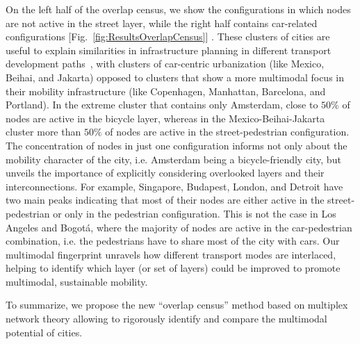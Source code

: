 On the left half of the overlap census, we show the configurations in which nodes are not active in the street layer, while the right half contains car-related configurations [Fig.~\ref{fig:ResultsOverlapCensus}] . These clusters of cities are useful to explain similarities in infrastructure planning in different transport development paths~\cite{Rodrigue2013Geography,louf2014typology}, with clusters of car-centric urbanization (like Mexico, Beihai, and Jakarta) opposed to clusters that show a more multimodal focus in their mobility infrastructure (like Copenhagen, Manhattan, Barcelona, and Portland). In the extreme cluster that contains only Amsterdam, close to $50\%$ of nodes are active in the bicycle layer, whereas in the Mexico-Beihai-Jakarta cluster more than $50\%$ of nodes are active in the street-pedestrian configuration. The concentration of nodes in just one configuration informs not only about the mobility character of the city, i.e. Amsterdam being a bicycle-friendly city, but unveils the importance of explicitly considering overlooked layers and their interconnections. For example, Singapore, Budapest, London, and Detroit have two main peaks indicating that most of their nodes are either active in the street-pedestrian or only in the pedestrian configuration. This is not the case in Los Angeles and Bogotá, where the majority of nodes are active in the car-pedestrian combination, i.e. the pedestrians have to share most of the city with cars. Our multimodal fingerprint unravels how different transport modes are interlaced, helping to identify which layer (or set of layers) could be improved to promote multimodal, sustainable mobility.

To summarize, we propose the new ``overlap census'' method based on multiplex network theory allowing to rigorously identify and compare the multimodal potential of cities.
